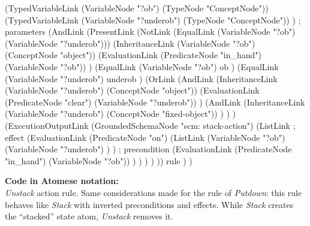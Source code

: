 \begin{python}
            (TypedVariableLink 
              (VariableNode "?ob") 
              (TypeNode "ConceptNode"))
            (TypedVariableLink 
              (VariableNode "?underob") 
              (TypeNode "ConceptNode"))
          ) ; parameters
          (AndLink
            (PresentLink
              (NotLink
                (EqualLink 
                  (VariableNode "?ob") 
                  (VariableNode "?underob")))
              (InheritanceLink
                (VariableNode "?ob")
                (ConceptNode "object"))
              (EvaluationLink
                (PredicateNode "in_hand")
                (VariableNode "?ob"))
            )
            (EqualLink
              (VariableNode "?ob")
              ob
            )
            (EqualLink
              (VariableNode "?underob")
              underob
            )
            (OrLink
              (AndLink
                (InheritanceLink
                  (VariableNode "?underob")
                  (ConceptNode "object"))
                (EvaluationLink
                  (PredicateNode "clear")
                  (VariableNode "?underob"))
              )
              (AndLink
                (InheritanceLink
                  (VariableNode "?underob")
                  (ConceptNode "fixed-object"))
              )
            )
          )
          (ExecutionOutputLink
            (GroundedSchemaNode "scm: stack-action")
            (ListLink
              ; effect
              (EvaluationLink
                (PredicateNode "on")
                (ListLink
                  (VariableNode "?ob")
                  (VariableNode "?underob")
                )
              )
              ; precondition
              (EvaluationLink
                (PredicateNode "in_hand")
                (VariableNode "?ob"))
             )
          )
        )
      )
    ))
    rule
  )
)
\end{python}

\bigskip

\begin{footnotesize}
\textbf{Code in Atomese notation:} \\
\textit{Unstack} action rule. Same considerations made for the rule of \textit{Putdown}: this rule behaves like \textit{Stack} with inverted preconditions and effects. While \textit{Stack} creates the \enquote{stacked} state atom, \textit{Unstack} removes it.
\end{footnotesize}


